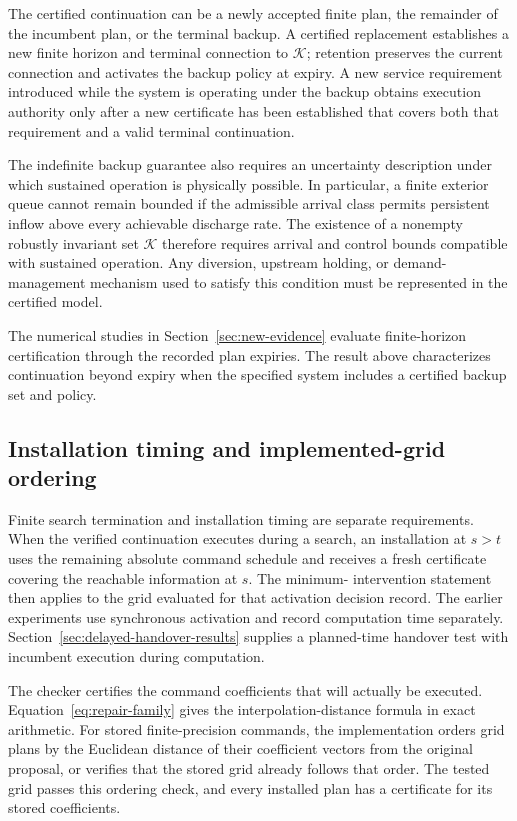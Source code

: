 \documentclass[journal,10pt]{IEEEtran}
\begin{document}
The certified continuation can be a newly accepted finite plan, the remainder
of the incumbent plan, or the terminal backup. A certified replacement
establishes a new finite horizon and terminal connection to $\mathcal K$;
retention preserves the current connection and activates the backup policy at
expiry. A new service
requirement introduced while the system is operating under the backup obtains
execution authority only after a new certificate has been established that
covers both that requirement and a valid terminal continuation.

The indefinite backup guarantee also requires an uncertainty description
under which sustained operation is physically possible. In particular, a
finite exterior queue cannot remain bounded if the admissible arrival class
permits persistent inflow above every achievable discharge rate. The existence
of a nonempty robustly invariant set $\mathcal K$ therefore requires arrival
and control bounds compatible with sustained operation. Any diversion,
upstream holding, or demand-management mechanism used to satisfy this
condition must be represented in the certified model.

The numerical studies in Section~\ref{sec:new-evidence} evaluate
finite-horizon certification through the recorded plan expiries. The result
above characterizes continuation beyond expiry when the specified system
includes a certified backup set and policy.

\subsection{Installation timing and implemented-grid ordering}

Finite search termination and installation timing are separate requirements.
When the verified continuation executes during a search, an installation at
$s>t$ uses the remaining absolute command schedule and receives a fresh
certificate covering the reachable information at $s$. The minimum-
intervention statement then applies to the grid evaluated for that activation
decision record. The earlier experiments use synchronous activation and record computation
time separately. Section~\ref{sec:delayed-handover-results} supplies a
planned-time handover test with incumbent execution during computation.

The checker certifies the command coefficients that will actually be
executed. Equation~\eqref{eq:repair-family} gives the interpolation-distance
formula in exact arithmetic. For stored finite-precision commands, the
implementation orders grid plans by the Euclidean distance of their
coefficient vectors from the original proposal, or verifies that the stored
grid already follows that order. The tested grid passes this ordering check,
and every installed plan has a certificate for its stored coefficients.
\end{document}
